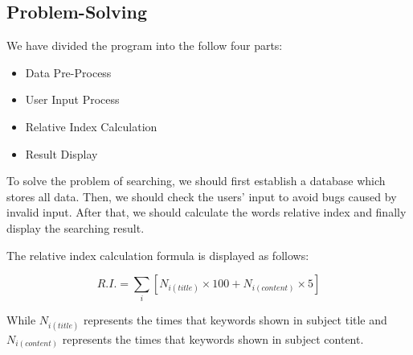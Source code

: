 \documentclass[manuscript,screen,review,12pt]{acmart}
\begin{document}
\subsection{Problem-Solving}
We have divided the program into the follow four parts:

\begin{itemize}
    \item Data Pre-Process
    \item User Input Process
    \item Relative Index Calculation
    \item Result Display
\end{itemize}

To solve the problem of searching, we should first establish a database which stores all data. Then, we should check the users' input to avoid bugs caused by invalid input. After that, we should calculate the words relative index and finally display the searching result.

The relative index calculation formula is displayed as follows:

\begin{equation}
    R.I. = \sum_{i} \left[ N_{i(title)} \times 100 + N_{i(content)} \times 5 \right]
\end{equation}

While $N_{i(title)}$ represents the times that keywords shown in subject title and $N_{i(content)}$ represents the times that keywords shown in subject content.
\end{document}
